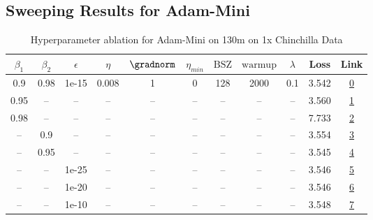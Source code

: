 \subsection{Sweeping Results for Adam-Mini}%
\begin{table}[H]
\centering
\caption{Hyperparameter ablation for Adam-Mini on 130m on 1x Chinchilla Data}
\label{tab:ablation_adam-mini_130m_on_1x_chinchilla_data}
\begin{tabular}{ccccccccccc}
\toprule
$\beta_1$ & $\beta_2$ & $\epsilon$ & $\eta$ & $\gradnorm$ & $\eta_{min}$ & $\mathrm{BSZ}$ & $\mathrm{warmup}$ & $\lambda$ & Loss & Link \\
\midrule
0.9 & 0.98 & 1e-15 & 0.008 & 1 & 0 & 128 & 2000 & 0.1 & 3.542 & \href{https://wandb.ai/stanford-mercury/optimizer-scaling/runs/sweep-130m-2B-minif4e66flr0.008-wd0.1-minlr0-warmup2000-b10.9-b2-4d3c05}{0} \\
\midrule
0.95 & -- & -- & -- & -- & -- & -- & -- & -- & 3.560 & \href{https://wandb.ai/stanford-mercury/optimizer-scaling/runs/sweep-130m-2B-minia4c40alr0.008-wd0.1-minlr0-warmup2000-b10.95-b-73290f}{1} \\
0.98 & -- & -- & -- & -- & -- & -- & -- & -- & 7.733 & \href{https://wandb.ai/stanford-mercury/optimizer-scaling/runs/sweep-130m-2B-mini59cf9alr0.008-wd0.1-minlr0-warmup2000-b10.98-b-df073b}{2} \\
-- & 0.9 & -- & -- & -- & -- & -- & -- & -- & 3.554 & \href{https://wandb.ai/stanford-mercury/optimizer-scaling/runs/sweep-130m-2B-mini84080dlr0.008-wd0.1-minlr0-warmup2000-b10.9-b2-d74517}{3} \\
-- & 0.95 & -- & -- & -- & -- & -- & -- & -- & 3.545 & \href{https://wandb.ai/stanford-mercury/optimizer-scaling/runs/sweep-130m-2B-minic9835clr0.008-wd0.1-minlr0-warmup2000-b10.9-b2-d57aa7}{4} \\
-- & -- & 1e-25 & -- & -- & -- & -- & -- & -- & 3.546 & \href{https://wandb.ai/stanford-mercury/optimizer-scaling/runs/sweep-130m-2B-mini510347lr0.008-wd0.1-minlr0-warmup2000-b10.9-b2-9a27cf}{5} \\
-- & -- & 1e-20 & -- & -- & -- & -- & -- & -- & 3.546 & \href{https://wandb.ai/stanford-mercury/optimizer-scaling/runs/sweep-130m-2B-mini6d8617lr0.008-wd0.1-minlr0-warmup2000-b10.9-b2-7a2d5e}{6} \\
-- & -- & 1e-10 & -- & -- & -- & -- & -- & -- & 3.548 & \href{https://wandb.ai/stanford-mercury/optimizer-scaling/runs/sweep-130m-2B-mini845331lr0.008-wd0.1-minlr0-warmup2000-b10.9-b2-fadab9}{7} \\

\end{tabular}
\end{table}
